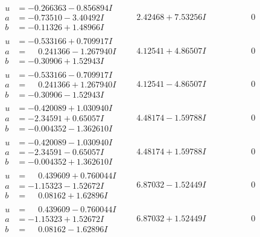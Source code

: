 \documentclass[1p]{elsarticle_modified}
\theoremstyle{definition}
\begin{document}
$$\begin{array}{c|c|c}
\begin{aligned}
u &= -0.266363 - 0.856894 I \\
a &= -0.73510 - 3.40492 I \\
b &= -0.11326 + 1.48966 I\end{aligned}
 & \phantom{-}2.42468 + 7.53256 I & \phantom{-0.000000 } 0 \\ \hline\begin{aligned}
u &= -0.533166 + 0.709917 I \\
a &= \phantom{-}0.241366 - 1.267940 I \\
b &= -0.30906 + 1.52943 I\end{aligned}
 & \phantom{-}4.12541 + 4.86507 I & \phantom{-0.000000 } 0 \\ \hline\begin{aligned}
u &= -0.533166 - 0.709917 I \\
a &= \phantom{-}0.241366 + 1.267940 I \\
b &= -0.30906 - 1.52943 I\end{aligned}
 & \phantom{-}4.12541 - 4.86507 I & \phantom{-0.000000 } 0 \\ \hline\begin{aligned}
u &= -0.420089 + 1.030940 I \\
a &= -2.34591 + 0.65057 I \\
b &= -0.004352 - 1.362610 I\end{aligned}
 & \phantom{-}4.48174 - 1.59788 I & \phantom{-0.000000 } 0 \\ \hline\begin{aligned}
u &= -0.420089 - 1.030940 I \\
a &= -2.34591 - 0.65057 I \\
b &= -0.004352 + 1.362610 I\end{aligned}
 & \phantom{-}4.48174 + 1.59788 I & \phantom{-0.000000 } 0 \\ \hline\begin{aligned}
u &= \phantom{-}0.439609 + 0.760044 I \\
a &= -1.15323 - 1.52672 I \\
b &= \phantom{-}0.08162 + 1.62896 I\end{aligned}
 & \phantom{-}6.87032 - 1.52449 I & \phantom{-0.000000 } 0 \\ \hline\begin{aligned}
u &= \phantom{-}0.439609 - 0.760044 I \\
a &= -1.15323 + 1.52672 I \\
b &= \phantom{-}0.08162 - 1.62896 I\end{aligned}
 & \phantom{-}6.87032 + 1.52449 I & \phantom{-0.000000 } 0 \\ \hline\begin{aligned}

\end{aligned}
\end{array}$$
\end{document}

